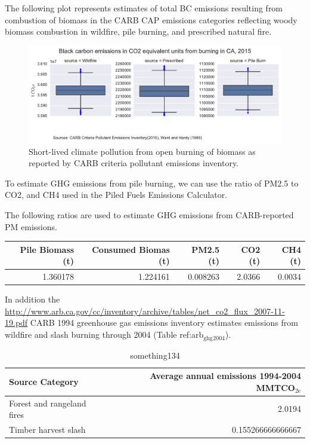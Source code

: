 \documentclass[a4paper]{article}
\begin{document}
The following plot represents estimates of total BC emissions resulting
from combustion of biomass in the CARB CAP emissions categories
reflecting woody biomass combustion in wildfire, pile burning, and
prescribed natural fire.


\begin{figure}[htb]
\centering
\includegraphics[width=\textwidth]{./graphics/bc_prob_gwp.pdf}
\caption{Short-lived climate pollution from open burning of biomass as reported by CARB criteria pollutant emissions inventory.}
\end{figure}


To estimate GHG emissions from pile burning, we can use the ratio of
PM2.5 to CO2, and CH4 used in the Piled Fuels Emissions Calculator. 

The following ratios are used to estimate GHG emissions from CARB-reported
PM emissions.

\begin{center}
\begin{tabular}{rrrrr}
Pile Biomass (t) & Consumed Biomas (t) & PM2.5 (t) & CO2 (t) & CH4 (t)\\
\hline
1.360178 & 1.224161 & 0.008263 & 2.0366 & 0.0034\\
\end{tabular}
\end{center}


In addition the
\url{http://www.arb.ca.gov/cc/inventory/archive/tables/net_co2_flux_2007-11-19.pdf}
CARB 1994 greenhouse gas emissions inventory estimates emissions from
wildfire and slash burning through 2004 (Table ref:arb$_{\text{ghg}}$$_{\text{2004}}$).
\begin{table}[htb]
\caption{something134}
\centering
\begin{tabular}{lr}
Source Category & Average annual emissions 1994-2004 MMTCO$_{\text{2e}}$\\
\hline
Forest and rangeland fires & 2.0194\\
Timber harvest slash & 0.155266666666667\\
\end{tabular}
\end{table}
\end{document}
